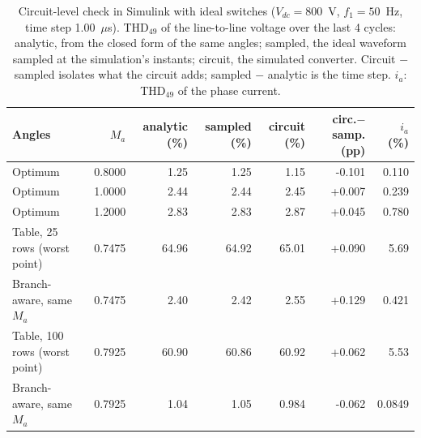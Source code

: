 \begin{table}[!t]
\centering
\caption{Circuit-level check in Simulink with ideal switches ($V_{dc} = 800$~V, $f_1 = 50$~Hz, time step 1.00~$\mu$s). THD$_{49}$ of the line-to-line voltage over the last 4 cycles: analytic, from the closed form of the same angles; sampled, the ideal waveform sampled at the simulation's instants; circuit, the simulated converter. Circuit $-$ sampled isolates what the circuit adds; sampled $-$ analytic is the time step. $i_a$: THD$_{49}$ of the phase current.}
\label{tab:circuit}
\footnotesize
\setlength{\tabcolsep}{4pt}
\begin{tabular}{lrrrrrr}
\toprule
Angles & $M_a$ & analytic (\%) & sampled (\%) & circuit (\%) & circ.$-$samp. (pp) & $i_a$ (\%) \\
\midrule
Optimum & 0.8000 & 1.25 & 1.25 & 1.15 & -0.101 & 0.110 \\
Optimum & 1.0000 & 2.44 & 2.44 & 2.45 & +0.007 & 0.239 \\
Optimum & 1.2000 & 2.83 & 2.83 & 2.87 & +0.045 & 0.780 \\
Table, 25 rows (worst point) & 0.7475 & 64.96 & 64.92 & 65.01 & +0.090 & 5.69 \\
Branch-aware, same $M_a$ & 0.7475 & 2.40 & 2.42 & 2.55 & +0.129 & 0.421 \\
Table, 100 rows (worst point) & 0.7925 & 60.90 & 60.86 & 60.92 & +0.062 & 5.53 \\
Branch-aware, same $M_a$ & 0.7925 & 1.04 & 1.05 & 0.984 & -0.062 & 0.0849 \\
\bottomrule
\end{tabular}
\end{table}
